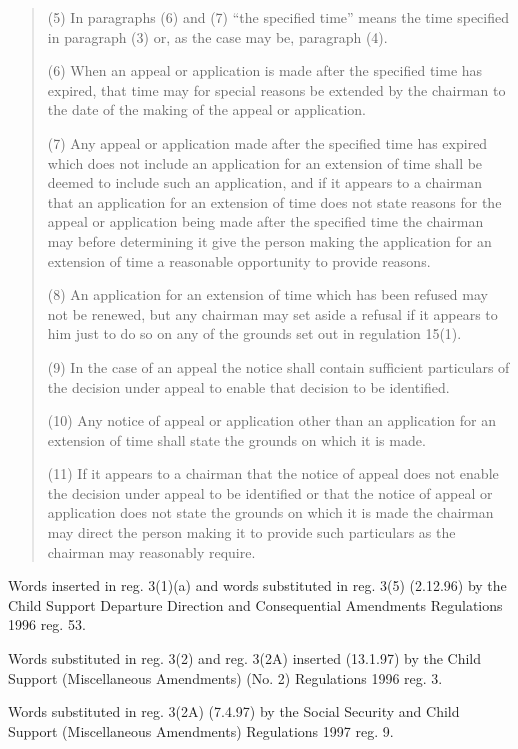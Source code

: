 \documentclass[12pt,a4paper]{article}
\begin{document}
{\begin{quotation}
(5) In paragraphs (6) and (7) “the specified time” means the time specified in paragraph (3) or, as the case may be, paragraph (4).

(6) When an appeal or application is made after the specified time has expired, that time may for special reasons be extended by the chairman to the date of the making of the appeal or application.

(7) Any appeal or application made after the specified time has expired which does not include an application for an extension of time shall be deemed to include such an application, and if it appears to a chairman that an application for an extension of time does not state reasons for the appeal or application being made after the specified time the chairman may before determining it give the person making the application for an extension of time a reasonable opportunity to provide reasons.

(8) An application for an extension of time which has been refused may not be renewed, but any chairman may set aside a refusal if it appears to him just to do so on any of the grounds set out in regulation 15(1).

(9) In the case of an appeal the notice shall contain sufficient particulars of the decision under appeal to enable that decision to be identified.

(10) Any notice of appeal or application other than an application for an extension of time shall state the grounds on which it is made.

(11) If it appears to a chairman that the notice of appeal does not enable the decision under appeal to be identified or that the notice of appeal or application does not state the grounds on which it is made the chairman may direct the person making it to provide such particulars as the chairman may reasonably require.
\end{quotation}

Words inserted in reg. 3(1)(a) and words substituted in reg. 3(5) (2.12.96) by the Child Support Departure Direction and Consequential Amendments Regulations 1996 reg. 53.

Words substituted in reg. 3(2) and reg. 3(2A) inserted (13.1.97) by the Child Support (Miscellaneous Amendments) (No. 2) Regulations 1996 reg. 3.

Words substituted in reg. 3(2A) (7.4.97) by the Social Security and Child Support (Miscellaneous Amendments) Regulations 1997 reg. 9.
}

\end{document}
